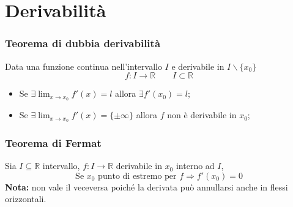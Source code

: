 \documentclass[x11names]{article}
\begin{document}
\section{Derivabilità}
\begin{center}
\colorbox{myred}{\begin{minipage}{5.75in}
\begin{redes}{}
\subsubsection{Teorema di dubbia derivabilità}
Data una funzione continua nell'intervallo $I$ e derivabile in $I \backslash\{x_0\}$
\[
f: I \to \mathbb{R} \qquad I \subset \mathbb{R}
\]
\begin{itemize}
    \item Se $\exists \lim_{x \to x_0}f'(x) = l$ allora $\exists f'(x_0) = l$;
    \item Se $\exists \lim_{x \to x_0}f'(x) = \{\pm \infty\}$ allora $f$ non è derivabile in $x_0$;
\end{itemize}
\end{redes}
\end{minipage}}        
\end{center}


\begin{center}
\colorbox{myred}{\begin{minipage}{5.75in}
\begin{redes}{}
\subsubsection{Teorema di Fermat}
Sia $I \subseteq \mathbb{R}$ intervallo, $f: I \to \mathbb{R}$ derivabile in $x_0$ interno ad $I$,
\[
\text{Se } x_0 \text{ punto di estremo per } f \Longrightarrow f'(x_0) = 0 
\]
\textbf{Nota:} non vale il veceversa poiché la derivata può annullarsi anche in flessi orizzontali.
\end{redes}
\end{minipage}}        
\end{center}
\end{document}
